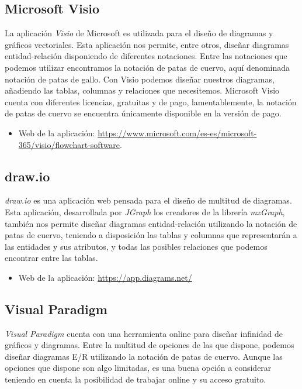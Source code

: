 \subsection{Microsoft Visio}
La aplicación \emph{Visio} de Microsoft es utilizada para el diseño de diagramas y gráficos vectoriales. Esta aplicación nos permite, entre otros, diseñar diagramas entidad-relación disponiendo de diferentes notaciones. Entre las notaciones que podemos utilizar encontramos la notación de patas de cuervo, aquí denominada notación de patas de gallo. Con Visio podemos diseñar nuestros diagramas, añadiendo las tablas, columnas y relaciones que necesitemos. Microsoft Visio cuenta con diferentes licencias, gratuitas y de pago, lamentablemente, la notación de patas de cuervo se encuentra únicamente disponible en la versión de pago.

\begin{itemize}
    \item Web de la aplicación: \url{https://www.microsoft.com/es-es/microsoft-365/visio/flowchart-software}.
\end{itemize}

\subsection{draw.io}
\emph{draw.io} es una aplicación web pensada para el diseño de multitud de diagramas. Esta aplicación, desarrollada por \emph{JGraph} los creadores de la librería \emph{mxGraph}, también nos permite diseñar diagramas entidad-relación utilizando la notación de patas de cuervo, teniendo a disposición las tablas y columnas que representarán a las entidades y sus atributos, y todas las posibles relaciones que podemos encontrar entre las tablas.

\begin{itemize}
    \item Web de la aplicación: \url{https://app.diagrams.net/}
\end{itemize}

\subsection{Visual Paradigm}
\emph{Visual Paradigm} cuenta con una herramienta online para diseñar infinidad de gráficos y diagramas. Entre la multitud de opciones de las que dispone, podemos diseñar diagramas E/R utilizando la notación de patas de cuervo. Aunque las opciones que dispone son algo limitadas, es una buena opción a considerar teniendo en cuenta la posibilidad de trabajar online y su acceso gratuito.

